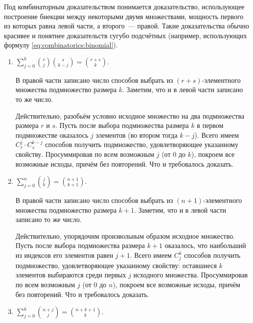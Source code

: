 \begin{Answer}
    \noindent
    Под комбинаторным доказательством понимается доказательство, использующее построение биекции
    между некоторыми двумя множествами, мощность первого из которых равна левой части, а второго~--- правой.
    Такие доказательства обычно красивее и понятнее доказательств сугубо подсчётных
    (например, использующих формулу \eqref{eq:combinatorics:binomial}).
    \begin{enumerate}
        \item
            $ \displaystyle \sum_{j=0}^k \binom{r}{j} \binom{s}{k-j} = \binom{r + s}{k} $.

            В правой части записано число способов выбрать из $ (r + s) $-элементного множества подмножество размера $ k $.
            Заметим, что и в левой части записано то же число.

            Действительно, разобьём условно исходное множество на два подмножества размера $ r $ и $ s $.
            Пусть после выбора подмножества размера $ k $ в первом подмножестве оказалось $ j $ элементов (во втором тогда $ k - j $).
            Всего имеем $ C_r^j \cdot C_s^{k-j} $ способов получить подмножество, удовлетворяющее указанному свойству.
            Просуммировав по всем возможным $ j $ (от $ 0 $ до $ k $), покроем все возможные исходы, причём без повторений.
            Что и требовалось доказать.
        \item
            $ \displaystyle \sum_{j=0}^n \binom{j}{k} = \binom{n+1}{k+1} $.

            В правой части записано число способов выбрать из $ (n+1) $-элементного множества подмножество размера $ k + 1 $.
            Заметим, что и в левой части записано то же число.

            Действительно, упорядочим произвольным образом исходное множество.
            Пусть после выбора подмножества размера $ k + 1 $ оказалось, что наибольший из индексов его элементов равен $ j + 1 $.
            Всего имеем $ C_j^k $ способов получить подмножество, удовлетворяющее указанному свойству:
            оставшиеся $ k $ элементов выбираются среди первых $ j $ исходного множества.
            Просуммировав по всем возможным $ j $ (от $ 0 $ до $ n $), покроем все возможные исходы, причём без повторений.
            Что и требовалось доказать.

        \item
            $ \displaystyle \sum_{j=0}^k \binom{n + j}{j} = \binom{n + k + 1}{k} $.


\end{enumerate}
\end{Answer}
